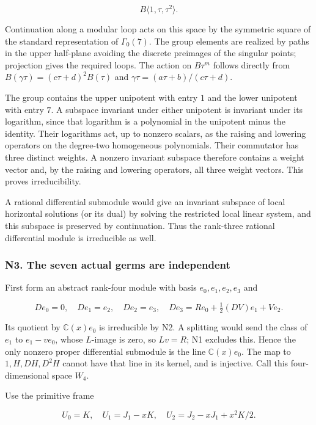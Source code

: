 \documentclass[11pt,a4paper]{article}
\begin{document}
\[
B\langle1,\tau,\tau^2\rangle.
\]

Continuation along a modular loop acts on this space by the symmetric square of the standard representation of \(Γ_{0}(7)\). The group elements are realized by paths in the upper half-plane avoiding the discrete preimages of the singular points; projection gives the required loops. The action on \(Bτ^m\) follows directly from \(B(γτ)=(cτ+d)^{2}B(τ)\) and \(γτ=(aτ+b)/(cτ+d)\).

The group contains the upper unipotent with entry \(1\) and the lower unipotent with entry \(7\). A subspace invariant under either unipotent is invariant under its logarithm, since that logarithm is a polynomial in the unipotent minus the identity. Their logarithms act, up to nonzero scalars, as the raising and lowering operators on the degree-two homogeneous polynomials. Their commutator has three distinct weights. A nonzero invariant subspace therefore contains a weight vector and, by the raising and lowering operators, all three weight vectors. This proves irreducibility.

A rational differential submodule would give an invariant subspace of local horizontal solutions (or its dual) by solving the restricted local linear system, and this subspace is preserved by continuation. Thus the rank-three rational differential module is irreducible as well.

\hypertarget{n3.-the-seven-actual-germs-are-independent}{%
\subsubsection{N3. The seven actual germs are independent}\label{n3.-the-seven-actual-germs-are-independent}}

First form an abstract rank-four module with basis \(e_{0},e_{1},e_{2},e_{3}\) and

\[
De_0=0,\quad De_1=e_2,\quad De_2=e_3,\quad
De_3=Re_0+\tfrac12(DV)e_1+Ve_2.
\]

Its quotient by \(\mathbb{C}(x)e_{0}\) is irreducible by N2. A splitting would send the class of \(e_{1}\) to \(e_{1}-ve_{0}\), whose \(L\)-image is zero, so \(Lv=R\); N1 excludes this. Hence the only nonzero proper differential submodule is the line \(\mathbb{C}(x)e_{0}\). The map to \(1,H,DH,D^{2}H\) cannot have that line in its kernel, and is injective. Call this four-dimensional space \(W_{4}\).

Use the primitive frame

\[
U_0=K,\quad U_1=J_1-xK,\quad
U_2=J_2-xJ_1+x^2K/2.
\]
\end{document}
